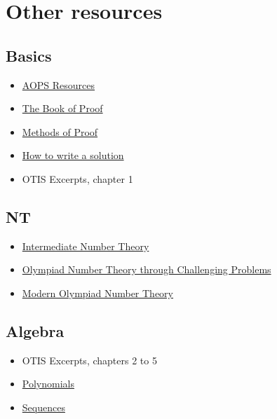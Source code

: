 \chapter{Other resources}
\section{Basics}
\begin{itemize}
  \item \href{https://artofproblemsolving.com/resources}{AOPS Resources}
  \item \href{https://www.people.vcu.edu/~rhammack/BookOfProof/Main.pdf}{The Book
  of Proof}
  \item
    \href{https://www.its.caltech.edu/~kpilch/olympiad/MethodsOfProof-Complete.pdf}
    {Methods of Proof}
  \item \href{https://artofproblemsolving.com/news/articles/how-to-write-a-solution}
    {How to write a solution}
  \item OTIS Excerpts, chapter 1
\end{itemize}

\section{NT}
\begin{itemize}
  \item
    \href{https://numbertheoryguydotcom.files.wordpress.com/2018/10/main1.pdf}
    {Intermediate Number Theory}
  \item
    \href{http://s3.amazonaws.com/aops-cdn.artofproblemsolving.com/resources/articles/olympiad-number-theory.pdf}
      {Olympiad Number Theory through Challenging Problems}
  \item \href{https://drive.google.com/file/d/1BcJTLjQaelZ4w_70oHKyImC2I8zLfyrt/view?usp=sharing}
    {Modern Olympiad Number Theory}
\end{itemize}

\section{Algebra}
\begin{itemize}
  \item OTIS Excerpts, chapters 2 to 5
  \item
    \href{https://alexanderrem.weebly.com/uploads/7/2/5/6/72566533/polynomials.pdf}
    {Polynomials}
  \item
    \href{https://alexanderrem.weebly.com/uploads/7/2/5/6/72566533/sequences.pdf}
    {Sequences}
\end{itemize}

